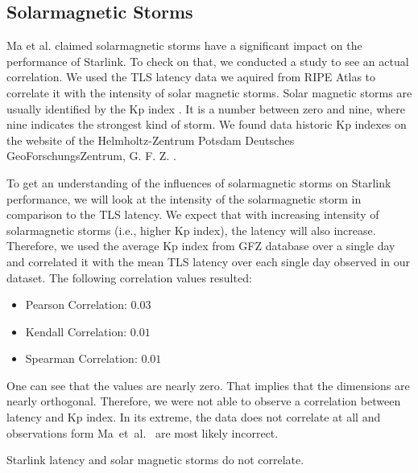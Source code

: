 \subsection{Solarmagnetic Storms} \label{sec:solarmagnetic-storms}

Ma et al. \cite{DBLP:conf/infocom/MaCZCML23} claimed solarmagnetic storms have
a significant impact on the performance of Starlink. To check on that, we
conducted a study to see an actual correlation. We used the TLS latency data we
aquired from RIPE Atlas to correlate it with the intensity of solar magnetic
storms. Solar magnetic storms are usually identified by the Kp index
\cite{Bartels1957}. It is a number between zero and nine, where nine indicates
the strongest kind of storm. We found data historic Kp indexes on the website
of the Helmholtz-Zentrum Potsdam Deutsches GeoForschungsZentrum, G. F. Z.
\cite{GFZ2023}.

To get an understanding of the influences of solarmagnetic storms on Starlink
performance, we will look at the intensity of the solarmagnetic storm in
comparison to the TLS latency. We expect that with increasing intensity of
solarmagnetic storms (i.e., higher Kp index), the latency will also increase.
Therefore, we used the average Kp index from GFZ database over a single day and
correlated it with the mean TLS latency over each single day observed in our
dataset. The following correlation values resulted:

\begin{itemize}
	\item Pearson Correlation: $0.03$
	\item Kendall Correlation: $0.01$
	\item Spearman Correlation: $0.01$
\end{itemize}

One can see that the values are nearly zero. That implies that the dimensions
are nearly orthogonal. Therefore, we were not able to observe a correlation
between latency and Kp index. In its extreme, the data does not correlate at
all and observations form Ma~et~al.~\cite{DBLP:conf/infocom/MaCZCML23} are most
likely incorrect.

\begin{takeaway}
	Starlink latency and solar magnetic storms do not correlate.
\end{takeaway}

